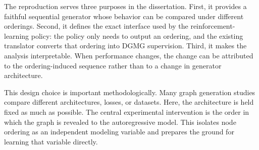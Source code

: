 The reproduction serves three purposes in the dissertation. First, it provides a faithful sequential generator whose behavior can be compared under different orderings. Second, it defines the exact interface used by the reinforcement-learning policy: the policy only needs to output an ordering, and the existing translator converts that ordering into DGMG supervision. Third, it makes the analysis interpretable. When performance changes, the change can be attributed to the ordering-induced sequence rather than to a change in generator architecture.

This design choice is important methodologically. Many graph generation studies compare different architectures, losses, or datasets. Here, the architecture is held fixed as much as possible. The central experimental intervention is the order in which the graph is revealed to the autoregressive model. This isolates node ordering as an independent modeling variable and prepares the ground for learning that variable directly.
